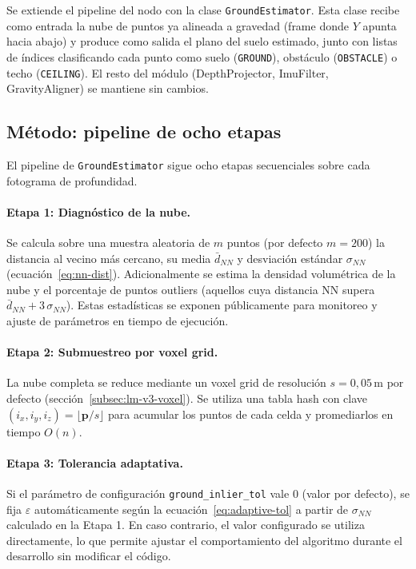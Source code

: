Se extiende el pipeline del nodo con la clase \texttt{GroundEstimator}.
Esta clase recibe como entrada la nube de puntos ya alineada a gravedad
(frame donde $Y$ apunta hacia abajo) y produce como salida el plano del
suelo estimado, junto con listas de índices clasificando cada punto como
suelo (\texttt{GROUND}), obstáculo (\texttt{OBSTACLE}) o techo
(\texttt{CEILING}). El resto del módulo (DepthProjector, ImuFilter, GravityAligner)
se mantiene sin cambios.


\subsection{Método: pipeline de ocho etapas}
\label{sec:lm-v3-pipeline}

El pipeline de \texttt{GroundEstimator} sigue ocho etapas secuenciales sobre
cada fotograma de profundidad.

\paragraph{Etapa 1: Diagnóstico de la nube.}
Se calcula sobre una muestra aleatoria de $m$ puntos (por defecto $m = 200$)
la distancia al vecino más cercano, su media $\bar{d}_{NN}$ y desviación
estándar $\sigma_{NN}$ (ecuación~\ref{eq:nn-dist}). Adicionalmente se estima
la densidad volumétrica de la nube y el porcentaje de puntos outliers
(aquellos cuya distancia NN supera $\bar{d}_{NN} + 3\,\sigma_{NN}$). Estas
estadísticas se exponen públicamente para monitoreo y ajuste de parámetros
en tiempo de ejecución.

\paragraph{Etapa 2: Submuestreo por voxel grid.}
La nube completa se reduce mediante un voxel grid de resolución $s =
0{,}05\,\text{m}$ por defecto (sección~\ref{subsec:lm-v3-voxel}). Se utiliza
una tabla hash con clave $(i_x, i_y, i_z) = \lfloor \mathbf{p}/s \rfloor$
para acumular los puntos de cada celda y promediarlos en tiempo $O(n)$.

\paragraph{Etapa 3: Tolerancia adaptativa.}
Si el parámetro de configuración \texttt{ground\_inlier\_tol} vale $0$ (valor
por defecto), se fija $\varepsilon$ automáticamente según la
ecuación~\ref{eq:adaptive-tol} a partir de $\sigma_{NN}$ calculado en la
Etapa 1. En caso contrario, el valor configurado se utiliza directamente,
lo que permite ajustar el comportamiento del algoritmo durante el desarrollo
sin modificar el código.

